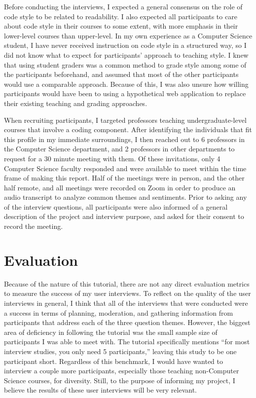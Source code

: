 \documentclass[10pt,twocolumn]{article}
\begin{document}
Before conducting the interviews, I expected a general consensus on the role of code style to be related to readability. I also expected all participants to care about code style in their courses to some extent, with more emphasis in their lower-level courses than upper-level. In my own experience as a Computer Science student, I have never received instruction on code style in a structured way, so I did not know what to expect for participants’ approach to teaching style. I knew that using student graders was a common method to grade style among some of the participants beforehand, and assumed that most of the other participants would use a comparable approach. Because of this, I was also unsure how willing participants would have been to using a hypothetical web application to replace their existing teaching and grading approaches. 

When recruiting participants, I targeted professors teaching undergraduate-level courses that involve a coding component. After identifying the individuals that fit this profile in my immediate surroundings, I then reached out to 6 professors in the Computer Science department, and 2 professors in other departments to request for a 30 minute meeting with them. Of these invitations, only 4 Computer Science faculty responded and were available to meet within the time frame of making this report. Half of the meetings were in person, and the other half remote, and all meetings were recorded on Zoom in order to produce an audio transcript to analyze common themes and sentiments. Prior to asking any of the interview questions, all participants were also informed of a general description of the project and interview purpose, and asked for their consent to record the meeting.  

\section{Evaluation}
Because of the nature of this tutorial, there are not any direct evaluation metrics to measure the success of my user interviews. To reflect on the quality of the user interviews in general, I think that all of the interviews that were conducted were a success in terms of planning, moderation, and gathering information from participants that address each of the three question themes. However, the biggest area of deficiency in following the tutorial was the small sample size of participants I was able to meet with. The tutorial specifically mentions “for most interview studies, you only need 5 participants,” leaving this study to be one participant short. Regardless of this benchmark, I would have wanted to interview a couple more participants, especially those teaching non-Computer Science courses, for diversity. Still, to the purpose of informing my project, I believe the results of these user interviews will be very relevant.
\end{document}
